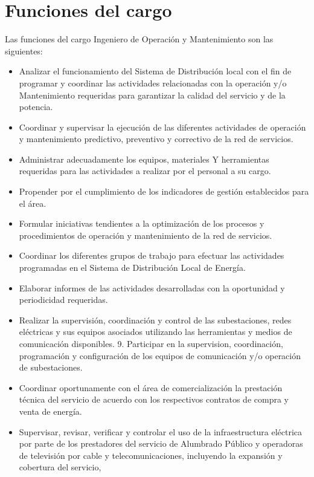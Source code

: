 \documentclass[a5paper]{book}%
\begin{document}
\section{Funciones del cargo}

Las funciones del cargo Ingeniero de Operación y Mantenimiento  son las siguientes:

\begin{itemize}
	\item  Analizar el funcionamiento del Sistema de Distribución local con el fin de programar y coordinar  las actividades relacionadas con la operación y/o Mantenimiento requeridas para garantizar la calidad del servicio y de la potencia.
	\item  Coordinar y supervisar la ejecución de las diferentes actividades de operación y mantenimiento predictivo,  preventivo y correctivo de la red de servicios.
	\item  Administrar adecuadamente los equipos, materiales Y herramientas requeridas para las actividades a realizar por el personal a su cargo.
	\item  Propender por el cumplimiento de los indicadores de gestión establecidos para el área.
	\item  Formular iniciativas tendientes a la optimización de los procesos y procedimientos de operación y mantenimiento de la red de servicios.
	\item  Coordinar los diferentes grupos de trabajo para efectuar las actividades programadas en  el Sistema de Distribución Local de Energía.
	\item  Elaborar informes de las actividades desarrolladas con la oportunidad y periodicidad requeridas.
	\item  Realizar la supervisión, coordinación y control de las subestaciones, redes eléctricas y sus equipos asociados utilizando las herramientas y
	medios de comunicación disponibles. 9. Participar en la supervision, coordinación, programación y configuración de los equipos de comunicación y/o operación de subestaciones.
	\item  Coordinar oportunamente con el área de comercialización la prestación técnica del servicio de acuerdo con los respectivos contratos de compra
	y venta de energía.
	\item  Supervisar, revisar, verificar y controlar el uso de la infraestructura eléctrica por parte de los prestadores del servicio de Alumbrado Público y
	operadoras de televisión por cable y telecomunicaciones, incluyendo la expansión y cobertura del servicio,

\end{itemize}
\end{document}
